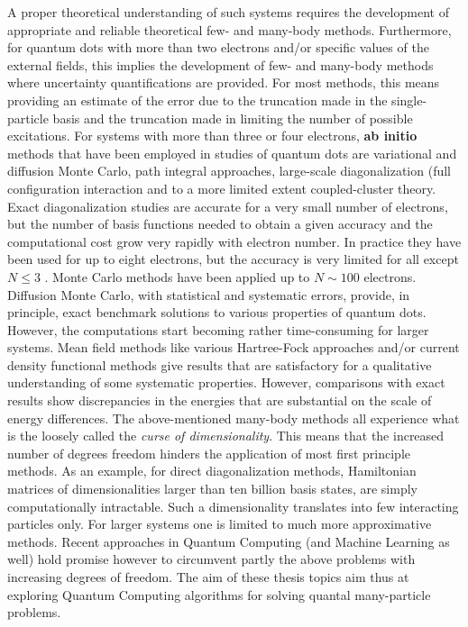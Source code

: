 \documentclass[%
oneside,                 %
final,                   %
10pt]{article}
\begin{document}
A proper theoretical understanding of such systems
requires the development of appropriate and reliable theoretical
few- and many-body methods.  Furthermore, for quantum dots with more
than two electrons and/or specific values of the external fields, this
implies the development of few- and many-body methods where
uncertainty quantifications are provided.  For most methods, this
means providing an estimate of the error due to the truncation made in
the single-particle basis and the truncation made in limiting the
number of possible excitations.  For systems with more than three or
four electrons, \textbf{ab initio} methods that have been employed in
studies of quantum dots are variational and diffusion Monte Carlo, path integral approaches, large-scale diagonalization (full configuration
interaction and to a more
limited extent coupled-cluster theory.
Exact diagonalization studies are accurate for a very small number of
electrons, but the number of basis functions needed to obtain a given
accuracy and the computational cost grow very rapidly with electron
number.  In practice they have been used for up to eight
electrons, but the accuracy is very
limited for all except $N\le 3$ .  Monte Carlo methods have been
applied up to $N\sim 100$ electrons. Diffusion Monte Carlo, with
statistical and systematic errors, provide, in principle, exact
benchmark solutions to various properties of quantum dots. However,
the computations start becoming rather time-consuming for larger
systems.  Mean field methods like various Hartree-Fock approaches and/or 
current density functional
methods give results that are
satisfactory for a qualitative understanding of some systematic
properties. However, comparisons with exact results show discrepancies
in the energies that are substantial on the scale of energy
differences. The above-mentioned many-body methods all experience what is the loosely called the \emph{curse of dimensionality}. This means that the increased number of degrees freedom hinders the application of most first principle methods. As an example, for direct diagonalization methods, Hamiltonian matrices of dimensionalities larger than ten billion basis states, are simply computationally intractable. Such a dimensionality translates into few interacting particles only. For larger systems one is limited to much more approximative methods. 
Recent approaches in Quantum Computing (and Machine Learning as well) hold promise however to circumvent partly the above problems with increasing degrees of freedom. 
The aim of these thesis topics aim thus at exploring Quantum Computing algorithms for solving quantal many-particle problems. 
\end{document}
